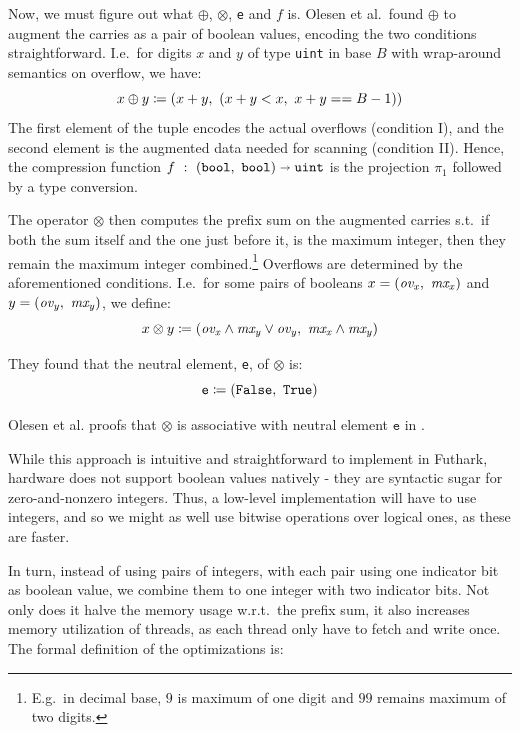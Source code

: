 Now, we must figure out what $\oplus$, $\otimes$, \texttt{e} and $f$ is. Olesen et
al.\ found $\oplus$ to augment the carries as a pair of boolean values, encoding the
two conditions straightforward. I.e.\ for digits $x$ and $y$ of type
\texttt{uint} in base $B$ with wrap-around semantics on overflow, we have:
\begin{equation}
\label{eq:oplus}
x \oplus y \coloneq (x + y,~(x + y < x,~x + y == B-1))
\end{equation}
The first element of the tuple encodes the actual overflows (condition I), and
the second element is the augmented data needed for scanning (condition
II). Hence, the compression function
$f~:~(\mathtt{bool},~\mathtt{bool}) \shortrightarrow \mathtt{uint}$ is the
projection $\pi_1$ followed by a type conversion.

The operator $\otimes$ then computes the prefix sum on the augmented carries s.t.\ if
both the sum itself and the one just before it, is the maximum integer, then
they remain the maximum integer combined.\footnote{E.g.\ in decimal base, $9$ is
  maximum of one digit and $99$ remains maximum of two digits.} Overflows are determined
by the aforementioned conditions. I.e.\ for some pairs of booleans
$x = (\mathit{ov_x},~\mathit{mx_{x}})$ and
$y = (\mathit{ov_y},~\mathit{mx_{y}})$, we define:
\begin{equation}
  \label{eq:otimes}
  x \otimes y \coloneq (\mathit{ov_x} \land \mathit{mx_y} \lor \mathit{ov_y},~\mathit{mx_x} \land \mathit{mx_y})
\end{equation}

They found that the neutral element, \texttt{e}, of $\otimes$ is:
\begin{equation}
  \label{eq:otimesne}
  \mathtt{e} \coloneq (\mathtt{False},~\mathtt{True})
\end{equation}

Olesen et al. proofs that $\otimes$ is associative with neutral element
$\mathtt{e}$ in \cite{DPPproject}.

While this approach is intuitive and straightforward to implement in Futhark,
hardware does not support boolean values natively - they are syntactic sugar for
zero-and-nonzero integers. Thus, a low-level implementation will have to use
integers, and so we might as well use bitwise operations over logical ones, as
these are faster.

In turn, instead of using pairs of integers, with each pair using one indicator
bit as boolean value, we combine them to one integer with two indicator
bits. Not only does it halve the memory usage w.r.t.\ the prefix sum, it also
increases memory utilization of threads, as each thread only have to fetch and
write once. The formal definition of the optimizations is:

